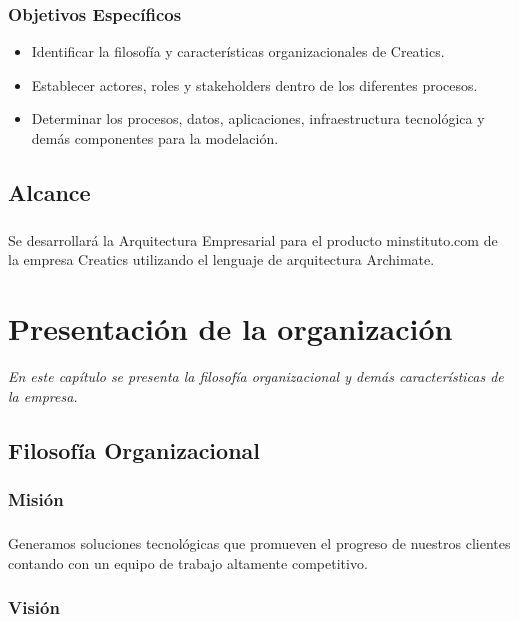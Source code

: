   \subsection{Objetivos Específicos}
    \begin{itemize}
      \item Identificar la filosofía y características organizacionales de Creatics.
      \item Establecer actores, roles y stakeholders dentro de los diferentes procesos.
      \item Determinar los procesos, datos, aplicaciones, infraestructura tecnológica y demás componentes para la modelación.
    \end{itemize}

\section{Alcance}
  \paragraph*{}
  Se desarrollará la Arquitectura Empresarial para el producto minstituto.com de la empresa Creatics utilizando el lenguaje de arquitectura Archimate.

\chapter{Presentación de la organización}
\label{chap:Descripcion}
\textit{En este capítulo se presenta la filosofía organizacional y demás características de la empresa.}
\vfill
\minitoc
\cleardoublepage

\section{Filosofía Organizacional}
  
  \subsection{Misión}
    \paragraph*{}
    Generamos soluciones tecnológicas que promueven el progreso de nuestros clientes contando con un equipo de trabajo altamente competitivo.
  
  \subsection{Visión}
